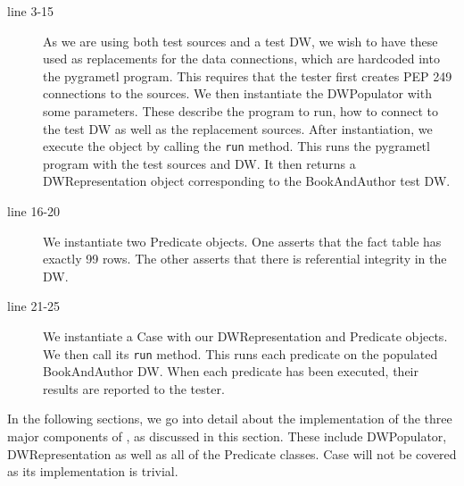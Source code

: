 \begin{description}
\item[line 3-15] As we are using both test sources and a test DW, we wish to have these used as replacements for the data connections, which are hardcoded into the pygrametl program. This requires that the tester first creates PEP 249 connections to the sources. We then instantiate the DWPopulator with some parameters. These describe the program to run, how to connect to the test DW as well as the replacement sources.  After instantiation, we execute the object by calling the \texttt{run} method. This runs the pygrametl program with the test sources and DW. It then returns a DWRepresentation object corresponding to the BookAndAuthor test DW.

\item[line 16-20] We instantiate two Predicate objects. One asserts that  the fact table has exactly 99 rows. The other asserts that there is referential integrity in the DW.

\item[line 21-25] We instantiate a Case with our DWRepresentation and Predicate objects. We then call its \texttt{run} method. This runs each predicate on the populated BookAndAuthor DW. When each predicate has been executed, their results are reported to the tester.   
\end{description}

In the following sections, we go into detail about the implementation of the three major components of \FW{}, as discussed in this section. These include DWPopulator, DWRepresentation as well as all of the Predicate classes. Case will not be covered as its implementation is trivial.
